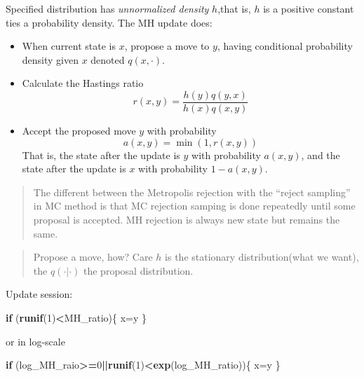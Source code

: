 \documentclass[
]{book}
\newenvironment{Shaded}{\begin{snugshade}}{\end{snugshade}}
\newcommand{\ControlFlowTok}[1]{\textcolor[rgb]{0.13,0.29,0.53}{\textbf{#1}}}
\newcommand{\DecValTok}[1]{\textcolor[rgb]{0.00,0.00,0.81}{#1}}
\newcommand{\KeywordTok}[1]{\textcolor[rgb]{0.13,0.29,0.53}{\textbf{#1}}}
\newcommand{\NormalTok}[1]{#1}
\newcommand{\OperatorTok}[1]{\textcolor[rgb]{0.81,0.36,0.00}{\textbf{#1}}}
\providecommand{\tightlist}{%
  \setlength{\itemsep}{0pt}\setlength{\parskip}{0pt}}
\theoremstyle{definition}
\theoremstyle{definition}
\theoremstyle{definition}
\theoremstyle{remark}
\begin{document}
Specified distribution has \emph{unnormalized density} \(h\),that is, \(h\) is a positive constant ties a probability density. The MH update does:

\begin{itemize}
\tightlist
\item
  When current state is \(x\), propose a move to \(y\), having conditional probability density given \(x\) denoted \(q(x,\cdot)\).
\item
  Calculate the Hastings ratio
  \[
  r(x, y)=\frac{h(y) q(y, x)}{h(x) q(x, y)}
  \]
\item
  Accept the proposed move \(y\) with probability
  \[
  a(x, y)=\min (1, r(x, y))
  \]
  That is, the state after the update is \(y\) with probability \(a(x,y)\), and the state after the update is \(x\) with probability \(1-a(x,y)\).
\end{itemize}

\begin{quote}
The different between the Metropolis rejection with the ``reject sampling'' in MC method is that MC rejection samping is done repeatedly until some proposal is accepted. MH rejection is always new state but remains the same.
\end{quote}

\begin{quote}
Propose a move, how? Care \(h\) is the stationary distribution(what we want), the \(q(\cdot|\cdot)\) the proposal distribution.
\end{quote}

Update session:

\begin{Shaded}
\begin{Highlighting}[]
\ControlFlowTok{if}\NormalTok{ (}\KeywordTok{runif}\NormalTok{(}\DecValTok{1}\NormalTok{)}\OperatorTok{<}\NormalTok{MH_ratio)\{}
\NormalTok{  x=y}
\NormalTok{\}}
\end{Highlighting}
\end{Shaded}

or in log-scale

\begin{Shaded}
\begin{Highlighting}[]
\ControlFlowTok{if}\NormalTok{ (log_MH_raio}\OperatorTok{>=}\DecValTok{0}\OperatorTok{||}\KeywordTok{runif}\NormalTok{(}\DecValTok{1}\NormalTok{)}\OperatorTok{<}\KeywordTok{exp}\NormalTok{(log_MH_ratio))\{}
\NormalTok{  x=y}
\NormalTok{  \}}
\end{Highlighting}
\end{Shaded}
\end{document}
